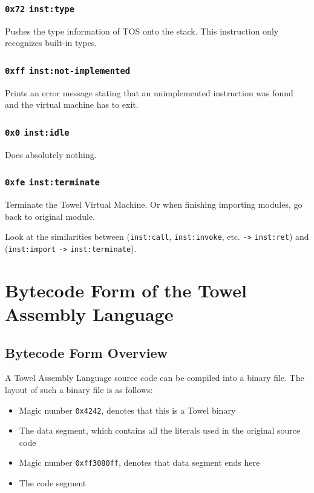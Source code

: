 \documentclass{report}
\newcommand{\inst}[1] {\texttt{inst:#1}}
\begin{document}
\subsection{\texttt{0x72} \inst{type} }

Pushes the type information of TOS onto the stack. This instruction only recognizes built-in types.

\subsection{\texttt{0xff} \inst{not-implemented}}

Prints an error message stating that an unimplemented instruction was found and the virtual machine has to exit.

\subsection{\texttt{0x0} \inst{idle}}

Does absolutely nothing.

\subsection{\texttt{0xfe} \inst{terminate}}

Terminate the Towel Virtual Machine. Or when finishing importing modules, go back to original module.

\begin{mdframed}[style=hint]
  Look at the similarities between (\inst{call}, \inst{invoke},
  etc. \texttt{->} \inst{ret}) and (\inst{import} \texttt{->}
  \inst{terminate}).
\end{mdframed}

\chapter{Bytecode Form of the Towel Assembly Language}

\section{Bytecode Form Overview}

A Towel Assembly Language source code can be compiled into a binary file. The layout of such a binary file is as follows:
\begin{itemize}
\item Magic number \texttt{0x4242}, denotes that this is a Towel binary
\item The data segment, which contains all the literals used in the original source code
\item Magic number \texttt{0xff3080ff}, denotes that data segment ends here
\item The code segment
\end{itemize}
\end{document}
